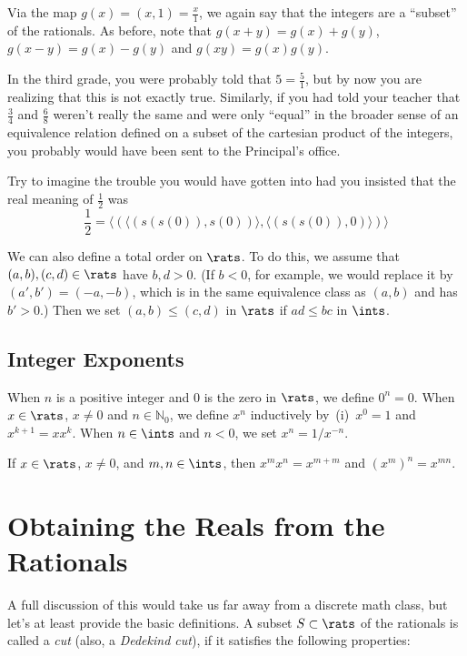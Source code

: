 Via the map $g(x) = (x,1)=\frac{x}{1}$, we again say that the integers
are a ``subset'' of the rationals.  As before, note that
$g(x+y) = g(x)+g(y)$, $g(x-y)=g(x)-g(y)$ and $g(xy)=g(x)g(y)$.

In the third grade,
you were probably told that $5 =\frac{5}{1}$, but by now
you are realizing that this is not exactly true.   
Similarly, if you had told your teacher that $\frac{3}{4}$ and
$\frac{6}{8}$ weren't really the same and were only ``equal'' in 
the broader sense of an equivalence relation defined on
a subset of the cartesian product of the integers, you
probably would have been sent to the Principal's office.

Try to imagine the trouble you would have gotten into had
you insisted that the real meaning
of $\frac{1}{2}$ was
\[
\frac{1}{2} =\langle(\langle(s(s(0)),s(0))\rangle,
  \langle(s(s(0)),0)\rangle)\rangle
\]

We can also define a total order on $\rats$. To do this, we assume
that $(a,b),(c,d)\in\rats$ have $b,d>0$. (If $b<0$, for example, we
would replace it by $(a',b')=(-a,-b)$, which is in the same
equivalence class as $(a,b)$ and has $b'>0$.) Then we set $(a,b)\leq
(c,d)$ in $\rats$ if $ad\leq bc$ in $\ints$.

\subsection{Integer Exponents}

When $n$ is a positive integer and $0$ is the zero in $\rats$, we
define $0^n=0$.  When $x\in\rats$, $x\neq 0$ and $n\in\mathbb{N}_0$,
we define $x^n$ inductively by~(i)~$x^0=1$ and $x^{k+1}=xx^k$.  When
$n\in\ints$ and $n<0$, we set $x^n=1/x^{-n}$.

\begin{theorem}
If $x\in\rats$, $x\neq0$, and $m,n\in\ints$, then
$x^mx^n=x^{m+m}$ and $(x^m)^n=x^{mn}$.
\end{theorem}

\section{Obtaining the Reals from the Rationals}\label{s:reals}

A full discussion of this would take us far away from 
a discrete math class, but let's at least provide the
basic definitions.  A subset $S\subset \rats$ of the rationals
is called a \textit{cut} (also, a \textit{Dedekind cut}), 
if it satisfies the following properties:

